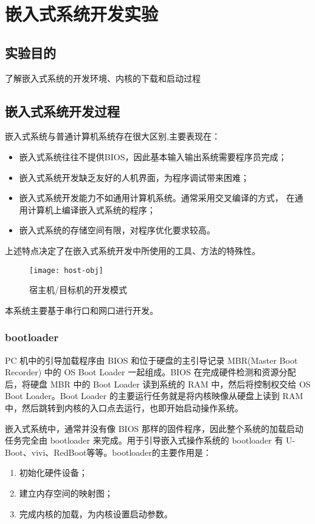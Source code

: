 \chapter{嵌入式系统开发实验}\label{ch-env}

\section{实验目的}
    了解嵌入式系统的开发环境、内核的下载和启动过程

\section{嵌入式系统开发过程}
    嵌入式系统与普通计算机系统存在很大区别,主要表现在：
\begin{itemize}\itemsep=-3pt
  \item 嵌入式系统往往不提供BIOS，因此基本输入输出系统需要程序员完成；
  \item 嵌入式系统开发缺乏友好的人机界面，为程序调试带来困难；
  \item 嵌入式系统开发能力不如通用计算机系统。通常采用交叉编译的方式，
        在通用计算机上编译嵌入式系统的程序；
  \item 嵌入式系统的存储空间有限，对程序优化要求较高。
\end{itemize}
    上述特点决定了在嵌入式系统开发中所使用的工具、方法的特殊性。

\begin{figure}[!h]
\centering
  \texttt{[image: host-obj]}
\caption{宿主机/目标机的开发模式}
\end{figure}

    本系统主要基于串行口和网口进行开发。

\subsection{bootloader}
	PC 机中的引导加载程序由 BIOS 和位于硬盘的主引导记录 MBR(Master Boot
Recorder) 中的 OS Boot Loader 一起组成。BIOS 在完成硬件检测和资源分配
后，将硬盘 MBR 中的 Boot Loader 读到系统的 RAM 中，然后将控制权交给
OS Boot Loader。Boot Loader 的主要运行任务就是将内核映像从硬盘上读到
RAM 中，然后跳转到内核的入口点去运行，也即开始启动操作系统。

	嵌入式系统中，通常并没有像 BIOS 那样的固件程序，因此整个系统的加载启动
任务完全由 bootloader 来完成。用于引导嵌入式操作系统的 bootloader 有
U-Boot、vivi、RedBoot等等。bootloader的主要作用是：
\begin{enumerate}\itemsep=-3pt
  \item 初始化硬件设备；
  \item 建立内存空间的映射图；
  \item 完成内核的加载，为内核设置启动参数。
\end{enumerate}

